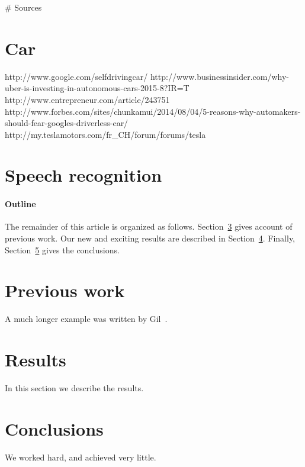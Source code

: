 \documentclass[11pt]{article}
\begin{document}
# Sources

\section{Car}

http://www.google.com/selfdrivingcar/
http://www.businessinsider.com/why-uber-is-investing-in-autonomous-cars-2015-8?IR=T
http://www.entrepreneur.com/article/243751
http://www.forbes.com/sites/chunkamui/2014/08/04/5-reasons-why-automakers-should-fear-googles-driverless-car/
http://my.teslamotors.com/fr_CH/forum/forums/tesla%

\section{Speech recognition}



\paragraph{Outline}
The remainder of this article is organized as follows.
Section~\ref{previous work} gives account of previous work.
Our new and exciting results are described in Section~\ref{results}.
Finally, Section~\ref{conclusions} gives the conclusions.

\section{Previous work}\label{previous work}
A much longer \LaTeXe{} example was written by Gil~\cite{Gil:02}.

\section{Results}\label{results}
In this section we describe the results.

\section{Conclusions}\label{conclusions}
We worked hard, and achieved very little.



\end{document}
